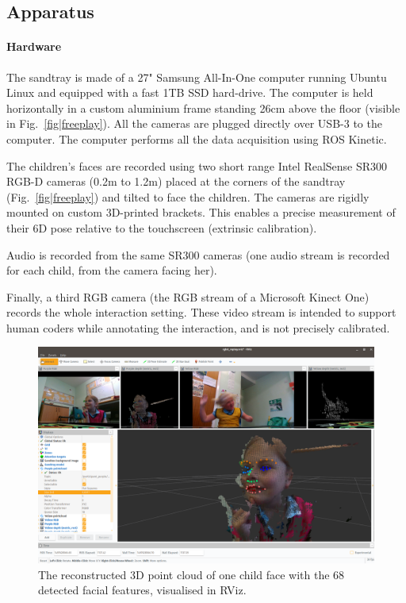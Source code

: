 \documentclass{article}
\begin{document}
\subsection{Apparatus}

\paragraph{Hardware}
The sandtray is made of a 27" Samsung All-In-One computer running Ubuntu Linux
and equipped with a fast 1TB SSD hard-drive. The computer is held horizontally in
a custom aluminium frame standing 26cm above the floor
(visible in Fig.~\ref{fig|freeplay}). All the cameras are plugged directly over
USB-3 to the computer. The computer performs all the data acquisition using ROS
Kinetic.

The children's faces are recorded using two short range Intel RealSense SR300
RGB-D cameras (0.2m to 1.2m) placed at the corners of the sandtray
(Fig.~\ref{fig|freeplay}) and tilted to face the children. The
cameras are rigidly mounted on custom 3D-printed brackets. This enables a
precise measurement of their 6D pose relative to the touchscreen (extrinsic
calibration).

Audio is recorded from the same SR300 cameras (one audio stream is recorded for
each child, from the camera facing her).

Finally, a third RGB camera (the RGB stream of a Microsoft Kinect One) records
the whole interaction setting. These video stream is intended to support human
coders while annotating the interaction, and is not precisely calibrated.

\begin{figure}[ht!]
    \centering
    \includegraphics[width=0.9\linewidth]{3d-point-cloud-facial-features}
    \caption{The reconstructed 3D point cloud of one child face with the
    68 detected facial features, visualised in RViz.}

    \label{fig|rviz}
\end{figure}
\end{document}
